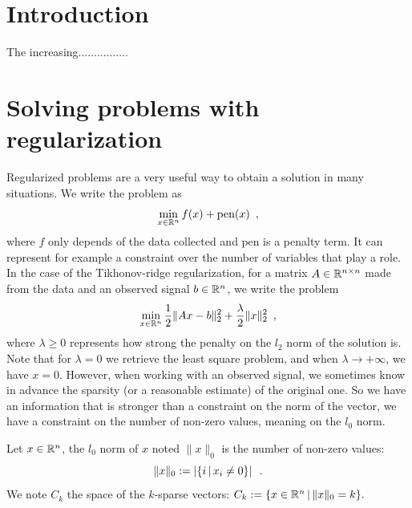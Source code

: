 \documentclass{article}
\begin{document}
\begin{titlepage}
	
	\vfill 
\end{titlepage}

\tableofcontents


\section*{Introduction}

The increasing................



\section{Solving problems with regularization}

Regularized problems are a very useful way to obtain a solution in many situations. We write the problem as 
\[\min_{x\in\mathbb{R}^n} f(x) + \mathrm{pen}(x)\enspace,\]
where $f$ only depends of the data collected and $\mathrm{pen}$ is a penalty term. It can represent for example a constraint over the number of variables that play a role.
In the case of the Tikhonov-ridge regularization, for a matrix $A\in\mathbb{R}^{n\times n}$ made from the data and an observed signal $b\in\mathbb{R}^n$, we write the problem
\[\min_{x\in\mathbb{R}^n} \frac{1}{2}\|Ax-b\|^2_2 + \frac{\lambda}{2}\|x\|^2_2\enspace,\]
where $\lambda \geq 0$ represents how strong the penalty on the $l_2$ norm of the solution is. Note that for $\lambda = 0$ we retrieve the least square problem, and when $\lambda\rightarrow +\infty$, we have $x=0$.
However, when working with an observed signal, we sometimes know in advance the sparsity (or a reasonable estimate) of the original one. So we have an information that is stronger than a constraint on the norm of the vector, we have a constraint on the number of non-zero values, meaning on the $l_0$ norm.

\begin{definition}
Let $x\in\mathbb{R}^n$, the $l_0$ norm of $x$ noted $\|x\|_0$ is the number of non-zero values: \[\|x\|_0:=\left|\{i\,|\, x_i\neq 0\}\right|\enspace .\]
We note $C_k$ the space of the $k$-sparse vectors: $C_k := \{x\in\mathbb{R}^n\,|\, \|x\|_0 = k\}.$
\end{definition}
\end{document}
